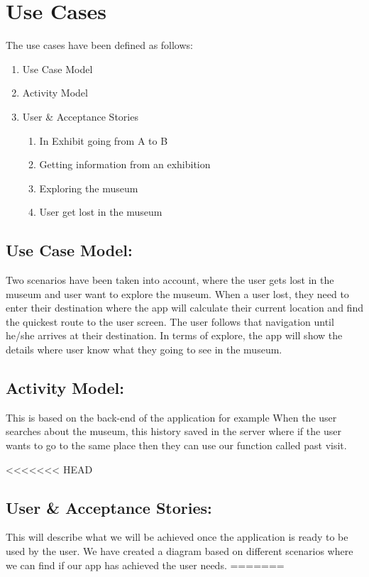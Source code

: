 \section{Use Cases}
The use cases have been defined as follows:
\begin{enumerate}
    \item Use Case Model
    \item Activity Model
    \item User \& Acceptance Stories
    \begin{enumerate}
        \item In Exhibit going from A to B
        \item Getting information from an exhibition
        \item Exploring the museum
        \item User get lost in the museum
    \end{enumerate}
\end{enumerate}

\subsection{Use Case Model:}
Two scenarios have been taken into account, where the user gets lost in the museum and user want to explore the museum. When a user lost, they need to enter their destination where the app will calculate their current location and find the quickest route to the user screen. The user follows that navigation until he/she arrives at their destination. In terms of explore, the app will show the details where user know what they going to see in the museum.

\subsection{Activity Model:}
This is based on the back-end of the application for example When the user searches about the museum, this history saved in the server where if the user wants to go to the same place then they can use our function called past visit.

<<<<<<< HEAD
\subsection{User \& Acceptance Stories:}
This will describe what we will be achieved once the application is ready to be used by the user. We have created a diagram based on different scenarios where we can find if our app has achieved the user needs. 
=======
